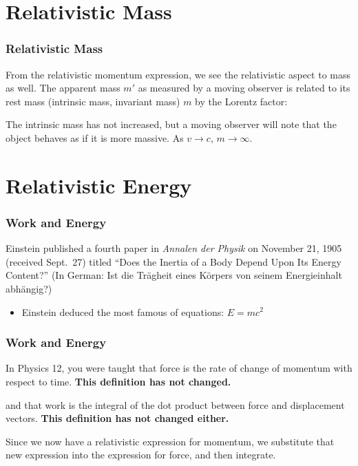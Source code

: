 \documentclass[12pt,compress,aspectratio=169]{beamer}
\newcommand{\mb}[1]{\mathbf{#1}}
\newcommand{\bigsqrt}{\ensuremath\sqrt{1-\left(\frac{v}{c}\right)^2}}
\newcommand{\eq}[2]{\vspace{#1}{\Large\begin{displaymath}#2\end{displaymath}}}
\begin{document}
\section[Mass]{Relativistic Mass}

\begin{frame}
  \frametitle{Relativistic Mass}
  From the relativistic momentum expression, we see the relativistic aspect to
  mass as well. The apparent mass $m'$ as measured by a moving observer is
  related to its rest mass (intrinsic mass, invariant mass) $m$ by the Lorentz
  factor:

  \eq{-.18in}{
    \boxed{m'=\frac{m}{\bigsqrt}=\gamma m}
  }
  
  The intrinsic mass has not increased, but a moving observer will note that
  the object behaves as if it is more massive. As $v\rightarrow c$,
  $m\rightarrow\infty$.
\end{frame}



\section[Energy]{Relativistic Energy}

\begin{frame}
  \frametitle{Work and Energy}
  Einstein published a fourth paper in \emph{Annalen der Physik} on November
  21, 1905 (received Sept.\ 27) titled ``Does the Inertia of a Body Depend Upon
  Its Energy Content?'' (In German: Ist die Tr\"{a}gheit eines K\"{o}rpers von
  seinem Energieinhalt abh\"{a}ngig?)
  \begin{itemize}
  \item Einstein deduced the most famous of equations: $E=mc^2$
  \end{itemize}
\end{frame}


\begin{frame}
  \frametitle{Work and Energy}
  In Physics 12, you were taught that force is the rate of change of momentum
  with respect to time. \textbf{This definition has not changed.}

  \eq{-.2in}{
    \mb{F}=\frac{d\mb{p}}{dt}
  }

  \vspace{-.1in}and that work is the integral of the dot product between force
  and displacement vectors. \textbf{This definition has not changed either.}

  \eq{-.2in}{
    W=\int\mb{F}\cdot d\mb{x}=\int\frac{d\mb{p}}{dt}\cdot \mb{dx}
  }

  \vspace{-.1in}Since we now have a relativistic expression for momentum, we
  substitute that new expression into the expression for force, and then
  integrate.
\end{frame}
\end{document}
